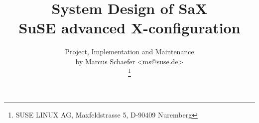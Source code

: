 \documentclass[11pt, english, a4paper, headsepline, footsepline,
BCOR1.5cm, DIV16, bigheadings, bibtotoc, idxtotoc, headinclude,
footexclude, abstracton]{scrbook}
\title{
  System Design of SaX\\
  SuSE advanced X-configuration
}
\author{
  Project, Implementation and Maintenance\\ 
  by Marcus Schaefer <ms@suse.de>\\
  \thanks{
  SUSE LINUX AG, Maxfeldstrasse 5, D-90409 Nuremberg
  }
}
\date{
 \vspace{1cm}
 \epsfig{
   file=pictures/logo.ps,width=4cm
 }\\
 \vspace{1.5cm}
 \vspace{3cm}
 \begin{tabbing}
  \hspace{2.6cm} Author: \quad\= Marcus Schaefer\\
  \hspace{2.6cm} Datum:\>  \today\\
 \end{tabbing}
}
\begin{document}
\dominitoc



\maketitle

\tableofcontents








\begin{thebibliography}{99}
 
\end{thebibliography}




\end{document}
